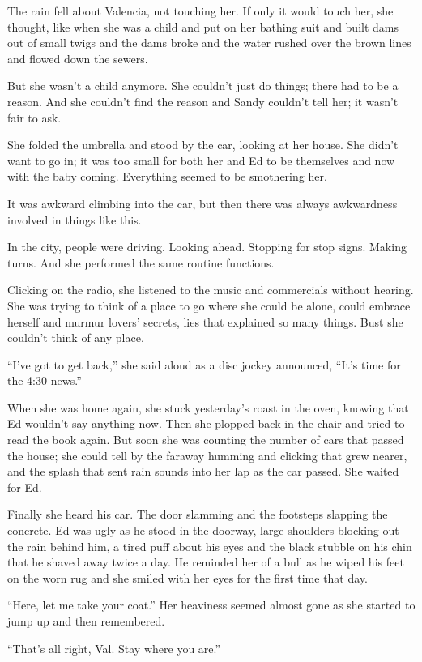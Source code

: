 \documentclass[twoside,10pt]{book}
\begin{document}
The rain fell about Valencia, not touching her. If only it would touch
her, she thought, like when she was a child and put on her bathing suit
and built dams out of small twigs and the dams broke and the water
rushed over the brown lines and flowed down the sewers.

But she wasn't a child anymore. She couldn't just do things; there had
to be a reason. And she couldn't find the reason and Sandy couldn't tell
her; it wasn't fair to ask.

She folded the umbrella and stood by the car, looking at her house. She
didn't want to go in; it was too small for both her and Ed to be
themselves and now with the baby coming. Everything seemed to be
smothering her.

It was awkward climbing into the car, but then there was always
awkwardness involved in things like this.

In the city, people were driving. Looking ahead. Stopping for stop
signs. Making turns. And she performed the same routine functions.

Clicking on the radio, she listened to the music and commercials without
hearing. She was trying to think of a place to go where she could be
alone, could embrace herself and murmur lovers' secrets, lies that
explained so many things. Bust she couldn't think of any place.

``I've got to get back,'' she said aloud as a disc jockey announced,
``It's time for the 4:30 news.''

When she was home again, she stuck yesterday's roast in the oven,
knowing that Ed wouldn't say anything now. Then she plopped back in the
chair and tried to read the book again. But soon she was counting the
number of cars that passed the house; she could tell by the faraway
humming and clicking that grew nearer, and the splash that sent rain
sounds into her lap as the car passed. She waited for Ed.

Finally she heard his car. The door slamming and the footsteps slapping
the concrete. Ed was ugly as he stood in the doorway, large shoulders
blocking out the rain behind him, a tired puff about his eyes and the
black stubble on his chin that he shaved away twice a day. He reminded
her of a bull as he wiped his feet on the worn rug and she smiled with
her eyes for the first time that day.

``Here, let me take your coat.'' Her heaviness seemed almost gone as she
started to jump up and then remembered.

``That's all right, Val. Stay where you are.''
\end{document}
